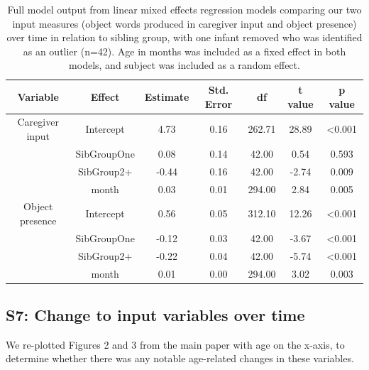 \documentclass[
  man,mask,floatsintext]{apa6}
\begin{document}
\begin{longtable}[t]{ccccccc}
\caption{\label{tab:table-input-model-summary-red}Full model output from linear mixed effects regression models comparing our two input measures (object words produced in caregiver input and object presence) over time in relation to sibling group, with one infant removed who was identified as an outlier (n=42). Age in months was included as a fixed effect in both models, and subject was included as a random effect.}\\
\toprule
Variable & Effect & Estimate & Std. Error & df & t value & p value\\
\midrule
Caregiver input & Intercept & 4.73 & 0.16 & 262.71 & 28.89 & <0.001\\
 & SibGroupOne & 0.08 & 0.14 & 42.00 & 0.54 & 0.593\\
 & SibGroup2+ & -0.44 & 0.16 & 42.00 & -2.74 & 0.009\\
 & month & 0.03 & 0.01 & 294.00 & 2.84 & 0.005\\
\midrule
Object presence & Intercept & 0.56 & 0.05 & 312.10 & 12.26 & <0.001\\
\addlinespace
 & SibGroupOne & -0.12 & 0.03 & 42.00 & -3.67 & <0.001\\
 & SibGroup2+ & -0.22 & 0.04 & 42.00 & -5.74 & <0.001\\
 & month & 0.01 & 0.00 & 294.00 & 3.02 & 0.003\\
\bottomrule
\end{longtable}
\newpage

\hypertarget{s7-change-to-input-variables-over-time}{%
\subsection{S7: Change to input variables over time}\label{s7-change-to-input-variables-over-time}}

We re-plotted Figures 2 and 3 from the main paper with age on the x-axis, to determine whether there was any notable age-related changes in these variables.
\end{document}

